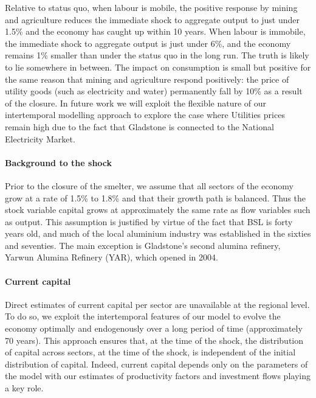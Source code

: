 \documentclass[12pt,a4paper]{article}
\begin{document}
Relative to status quo, when labour is mobile, the positive response by mining
and agriculture reduces the immediate shock to aggregate output to just under
1.5\% and the economy has caught up within 10 years.  When labour is immobile,
the immediate shock to aggregate output is just under 6\%, and the economy
remains 1\% smaller than under the status quo in the long run. The truth is
likely to lie somewhere in between. The impact on consumption is small but
positive for the same reason that mining and agriculture respond positively:
the price of utility goods (such as electricity and water) permanently fall by
10\% as a result of the closure. In future work we will exploit the flexible
nature of our intertemporal modelling approach to explore the case where
Utilities prices remain high due to the fact that Gladstone is connected to the
National Electricity Market.

\paragraph{Background to the shock} Prior to the closure of the smelter, we
assume that all sectors of the economy grow at a rate of 1.5\% to 1.8\% and
that their growth path is balanced. Thus the stock variable capital grows at
approximately the same rate as flow variables such as output.  This assumption
is justified by virtue of the fact that BSL is forty years old, and much of the
local aluminium industry was established in the sixties and seventies.  The
main exception is Gladstone's second alumina refinery, Yarwun Alumina Refinery
(YAR), which opened in 2004.

\paragraph{Current capital} Direct estimates of current capital per sector are
unavailable at the regional level. To do so, we exploit the intertemporal
features of our model to evolve the economy optimally and endogenously over a
long period of time (approximately 70 years).  This approach ensures that, at
the time of the shock, the distribution of capital across sectors, at the time
of the shock, is independent of the initial distribution of capital.  Indeed,
current capital depends only on the parameters of the model with our estimates
of productivity factors and investment flows playing a key role. 
\end{document}
